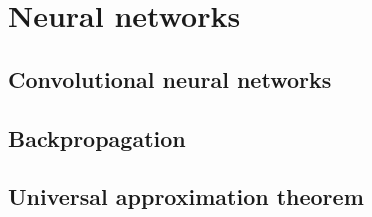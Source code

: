 



\section{Neural networks}

\subsection{Convolutional neural networks}

\subsection{Backpropagation}
\subsection{Universal approximation theorem}